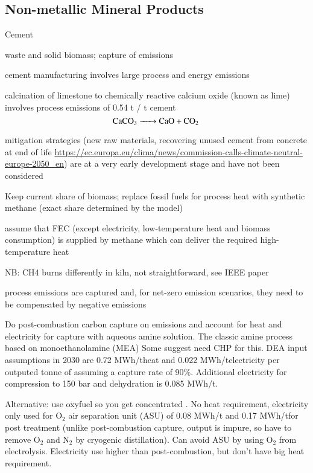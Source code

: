 \subsection{Non-metallic Mineral Products}
\label{sec:si:industry:nmmp}

Cement


waste and solid biomass; capture of \co emissions

cement manufacturing involves large process and energy emissions

calcination of limestone to chemically reactive calcium oxide (known as lime)
involves process emissions of 0.54 t \ce{\co} / t cement
\begin{equation}
    \ce{CaCO3 -> CaO + \co}
\end{equation}

mitigation strategies (new raw materials, recovering unused cement from concrete at end of life \url{https://ec.europa.eu/clima/news/commission-calls-climate-neutral-europe-2050_en})
are at a very early development stage and have not been considered

Keep current share of biomass; replace fossil fuels for process heat with
synthetic methane (exact share determined by the model)

assume that FEC (except electricity, low-temperature heat and biomass consumption)
is supplied by methane which can deliver the required high-temperature heat

NB: CH4 burns differently in kiln, not straightforward, see IEEE paper

process emissions are captured and, for net-zero emission scenarios,
they need to be compensated by negative emissions

Do post-combustion carbon capture on emissions and account for heat and
electricity for capture with aqueous amine solution. The classic amine process
based on monoethanolamine (MEA) Some suggest need CHP for this. DEA input
assumptions in 2030 are 0.72 MWh/t\co heat and 0.022 MWh/t\co electricity
per outputed tonne of \co assuming a capture rate of 90\%. Additional
electricity for \co compression to 150 bar and dehydration is 0.085
MWh/t\co.

Alternative: use oxyfuel so you get concentrated \co. No heat requirement,
electricity only used for O$_2$ air separation unit (ASU) of 0.08 MWh/t\co
and 0.17 MWh/t\co for post treatment (unlike post-combustion capture, output
is impure, so have to remove O$_2$ and N$_2$ by cryogenic distillation). Can
avoid ASU by using O$_2$ from electrolysis. Electricity use higher than
post-combustion, but don't have big heat requirement.

